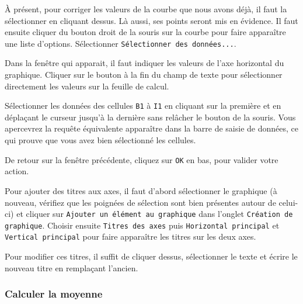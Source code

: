 À présent, pour corriger les valeurs de la courbe que nous avons déjà, il faut la sélectionner en cliquant dessus. Là aussi, ses points seront mis en évidence. Il faut ensuite cliquer du bouton droit de la souris sur la courbe pour faire apparaître une liste d'options. Sélectionner \texttt{Sélectionner des données...}.


Dans la fenêtre qui apparait, il faut indiquer les valeurs de l'axe horizontal du graphique. Cliquer sur le bouton à la fin du champ de texte pour sélectionner directement les valeurs sur la feuille de calcul.


Sélectionner les données des cellules \texttt{B1} à \texttt{I1} en cliquant sur la première et en déplaçant le curseur jusqu'à la dernière sans relâcher le bouton de la souris.  Vous apercevrez la requête équivalente apparaître dans la barre de saisie de données, ce qui prouve que vous avez bien sélectionné les cellules. 


De retour sur la fenêtre précédente, cliquez sur \texttt{OK} en bas, pour valider votre action.


Pour ajouter des titres aux axes, il faut d'abord sélectionner le graphique (à nouveau, vérifiez que les poignées de sélection sont bien présentes autour de celui-ci) et cliquer sur \texttt{Ajouter un élément au graphique} dans l'onglet \texttt{Création de graphique}.  Choisir ensuite \texttt{Titres des axes}  puis \texttt{Horizontal principal} et \texttt{Vertical principal} pour faire apparaître les titres sur les deux axes. 


Pour modifier ces titres, il suffit de cliquer dessus, sélectionner le texte et écrire le nouveau titre en remplaçant l'ancien.

\subsubsection{Calculer la moyenne}


